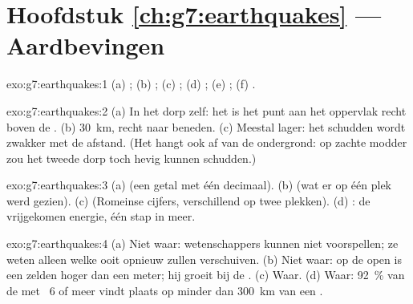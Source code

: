 \section*{Hoofdstuk \ref{ch:g7:earthquakes} --- Aardbevingen}

\begin{solution}{exo:g7:earthquakes:1}
(a) ; (b) ; (c) ; (d) ; (e) ;
(f) .
\end{solution}

\begin{solution}{exo:g7:earthquakes:2}
(a) In het dorp zelf: het  is het punt aan het oppervlak recht
boven de . (b) \qty{30}{km}, recht naar beneden. (c) Meestal lager:
het schudden wordt zwakker met de afstand. (Het hangt ook af van de
ondergrond: op zachte modder zou het tweede dorp toch hevig kunnen
schudden.)
\end{solution}

\begin{solution}{exo:g7:earthquakes:3}
(a)  (een getal met één decimaal). (b)  (wat er op één
plek werd gezien). (c)  (Romeinse cijfers, verschillend op twee
plekken). (d) : de vrijgekomen energie, één stap in 
meer.
\end{solution}

\begin{solution}{exo:g7:earthquakes:4}
(a) Niet waar: wetenschappers kunnen  niet voorspellen; ze
weten alleen welke  ooit opnieuw zullen verschuiven. (b) Niet waar:
op de open  is een  zelden hoger dan een meter; hij groeit bij
de . (c) Waar. (d) Waar: 92~\% van de  met ~6 of
meer vindt plaats op minder dan \qty{300}{km} van een .
\end{solution}

